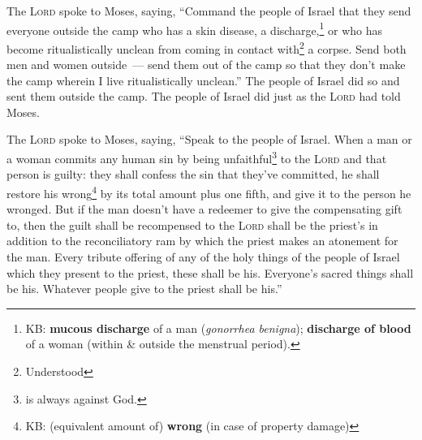 
\begin{inparaenum}
     The \textsc{Lord} spoke to Moses, saying,%
     ``Command the people of Israel that they send everyone outside the camp who has a skin disease, a discharge,\footnote{KB: \textbf{mucous discharge} of a man (\textit{gonorrhea benigna}); \textbf{discharge of blood} of a woman (within \& outside the menstrual period).} or who has become ritualistically unclean from coming in contact with\footnote{Understood} a corpse.%
     Send both men and women outside~--- send them out of the camp so that they don't make the camp wherein I live ritualistically unclean.''%
     The people of Israel did so and sent them outside the camp. The people of Israel did just as the \textsc{Lord} had told Moses.%
    
     The \textsc{Lord} spoke to Moses, saying,%
     ``Speak to the people of Israel. When a man or a woman commits any human sin by being unfaithful\footnote{ is always against God.} to the \textsc{Lord} and that person is guilty:%
     they shall confess the sin that they've committed, he shall restore his wrong\footnote{KB: (equivalent amount of) \textbf{wrong} (in case of property damage)} by its total amount plus one fifth, and give it to the person he wronged.%
     But if the man doesn't have a redeemer to give the compensating gift to, then the guilt shall be recompensed to the \textsc{Lord} shall be the priest's in addition to the reconciliatory ram by which the priest makes an atonement for the man.%
     Every tribute offering of any of the holy things of the people of Israel which they present to the priest, these shall be his.%
     Everyone's sacred things shall be his. Whatever people give to the priest shall be his.''%
    

\end{inparaenum}
